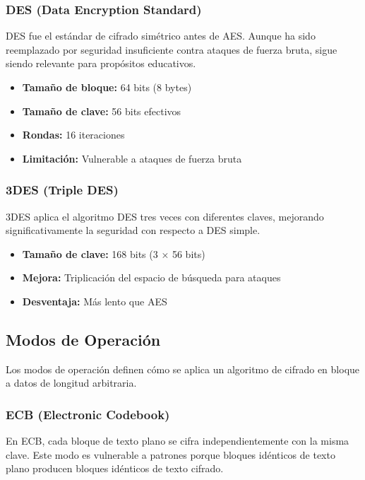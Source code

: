 \documentclass[11pt,a4paper]{article}
\begin{document}
\subsubsection{DES (Data Encryption Standard)}

DES fue el estándar de cifrado simétrico antes de AES. Aunque ha sido reemplazado por seguridad insuficiente contra ataques de fuerza bruta, sigue siendo relevante para propósitos educativos.

\begin{itemize}
    \item \textbf{Tamaño de bloque:} 64 bits (8 bytes)
    \item \textbf{Tamaño de clave:} 56 bits efectivos
    \item \textbf{Rondas:} 16 iteraciones
    \item \textbf{Limitación:} Vulnerable a ataques de fuerza bruta
\end{itemize}

\subsubsection{3DES (Triple DES)}

3DES aplica el algoritmo DES tres veces con diferentes claves, mejorando significativamente la seguridad con respecto a DES simple.

\begin{itemize}
    \item \textbf{Tamaño de clave:} 168 bits (3 × 56 bits)
    \item \textbf{Mejora:} Triplicación del espacio de búsqueda para ataques
    \item \textbf{Desventaja:} Más lento que AES
\end{itemize}

\subsection{Modos de Operación}

Los modos de operación definen cómo se aplica un algoritmo de cifrado en bloque a datos de longitud arbitraria.

\subsubsection{ECB (Electronic Codebook)}

En ECB, cada bloque de texto plano se cifra independientemente con la misma clave. Este modo es vulnerable a patrones porque bloques idénticos de texto plano producen bloques idénticos de texto cifrado.
\end{document}
